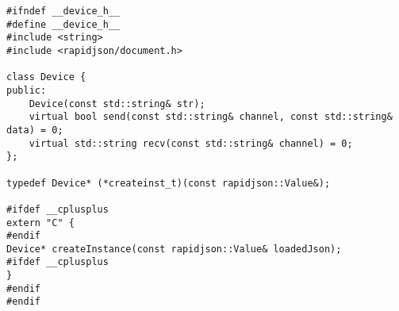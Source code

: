 \documentclass{article}
\begin{document}
 
\begin{verbatim} 
#ifndef __device_h__
#define __device_h__
#include <string>
#include <rapidjson/document.h>

class Device {
public:
    Device(const std::string& str);
    virtual bool send(const std::string& channel, const std::string& data) = 0;
    virtual std::string recv(const std::string& channel) = 0;
};

typedef Device* (*createinst_t)(const rapidjson::Value&);

#ifdef __cplusplus
extern "C" {
#endif
Device* createInstance(const rapidjson::Value& loadedJson);
#ifdef __cplusplus
}
#endif
#endif
\end{verbatim} 
\end{document}
